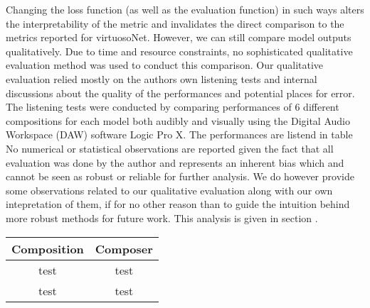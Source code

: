 Changing the loss function (as well as the evaluation function) in such ways alters the interpretability of the metric and invalidates the direct comparison to the metrics reported for virtuosoNet. However, we can still compare model outputs qualitatively. Due to time and resource constraints, no sophisticated qualitative evaluation method was used to conduct this comparison. Our qualitative evaluation relied mostly on the authors own listening tests and internal discussions about the quality of the performances and potential places for error. The listening tests were conducted by comparing performances of 6 different compositions for each model both audibly and visually using the Digital Audio Workspace (DAW) software Logic Pro X. The performances are listend in table  No numerical or statistical observations are reported given the fact that all evaluation was done by the author and represents an inherent bias which and cannot be seen as robust or reliable for further analysis. We do however provide some observations related to our qualitative evaluation along with our own intepretation of them, if for no other reason than to guide the intuition behind more robust methods for future work. This analysis is given in section .

\begin{table}
    \begin{center}
    \begin{tabular}[]{| c | c |}
        \hline
        Composition & Composer \\ 
        \hline 
        test & test \\
        test & test \\ 
        \hline
    \end{tabular}
    \end{center}
\end{table}


